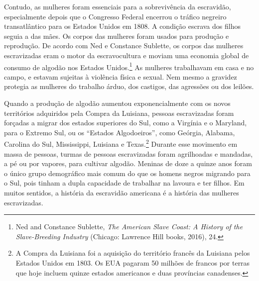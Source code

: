 Contudo, as mulheres foram essenciais para a sobrevivência da
escravidão, especialmente depois que o Congresso Federal encerrou o
tráfico negreiro transatlântico para os Estados Unidos em 1808. A
condição escrava dos filhos seguia a das mães. Os corpos das mulheres
foram usados para produção e reprodução. De acordo com Ned e Constance
Sublette, os corpos das mulheres escravizadas eram o motor da
escravocultura e moviam uma economia global de consumo de algodão nos
Estados Unidos.\footnote{Ned and Constance Sublette, \emph{The American
  Slave Coast: A History of the Slave-Breeding Industry} (Chicago:
  Lawrence Hill books, 2016), 24.} As mulheres trabalhavam em casa e no
campo, e estavam sujeitas à violência física e sexual. Nem mesmo a
gravidez protegia as mulheres do trabalho árduo, dos castigos, das
agressões ou dos leilões.

Quando a produção de algodão aumentou exponencialmente com os novos
territórios adquiridos pela Compra da Luisiana, pessoas escravizadas
foram forçadas a migrar dos estados superiores do Sul, como a Virgínia e
o Maryland, para o Extremo Sul, ou os ``Estados Algodoeiros'', como
Geórgia, Alabama, Carolina do Sul, Mississippi, Luisiana e
Texas.\footnote{A Compra da Luisiana foi a aquisição do território
  francês da Luisiana pelos Estados Unidos em 1803. Os EUA pagaram 50
  milhões de francos por terras que hoje incluem quinze estados
  americanos e duas províncias canadenses.} Durante esse movimento em
massa de pessoas, turmas de pessoas escravizadas foram agrilhoadas e
mandadas, a pé ou por vapores, para cultivar algodão. Meninas de doze a
quinze anos foram o único grupo demográfico mais comum do que os homens
negros migrando para o Sul, pois tinham a dupla capacidade de trabalhar
na lavoura e ter filhos. Em muitos sentidos, a história da escravidão
americana é a história das mulheres escravizadas.

